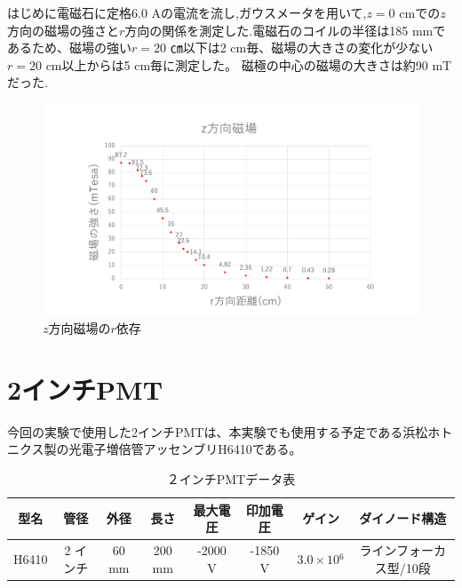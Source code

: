 \newpage
はじめに電磁石に定格6.0 Aの電流を流し,ガウスメータを用いて,$z=0$ cmでの$z$方向の磁場の強さと$r$方向の関係を測定した.電磁石のコイルの半径は185 mmであるため、磁場の強い$r=20$ ㎝以下は2 cm毎、磁場の大きさの変化が少ない$r=20$ cm以上からは5 cm毎に測定した。
磁極の中心の磁場の大きさは約90 mTだった.
\begin{figure}[h!]
	\centering
	\includegraphics[width=15cm]{fig/iguchi/maggraph01.pdf}
	\caption{$z$方向磁場の$r$依存}
	\label{maggraph01}
\end{figure}


\newpage
\section{2インチPMT}
今回の実験で使用した2インチPMTは、本実験でも使用する予定である浜松ホトニクス製の光電子増倍管アッセンブリH6410\cite{pmtH6410}である。

\begin{table}[htb]
	\centering
	 \begin{tabular}{cccccccc}\hline
	型名& 管径 & 外径 & 長さ & 最大電圧 & 印加電圧 & ゲイン & ダイノード構造 \\ \hline \hline
	H6410 & 2 インチ & 60 mm & 200 mm & -2000 V & -1850 V & $3.0\times10{^{6}}$ &ラインフォーカス型/10段 \\ \hline
	\end{tabular}
	  \caption{２インチPMTデータ表}
\end{table}

